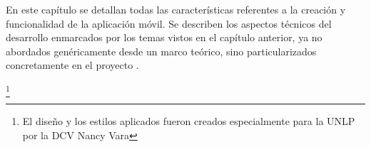 En este capítulo se detallan todas las características referentes a la creación y funcionalidad de la aplicación móvil. Se describen los aspectos técnicos del desarrollo enmarcados por los temas vistos en el capítulo anterior, ya no abordados genéricamente desde un marco teórico, sino particularizados concretamente en el proyecto \nombreApp. 


\footnote{El diseño y los estilos aplicados fueron creados especialmente para la UNLP por la DCV Nancy Vara}